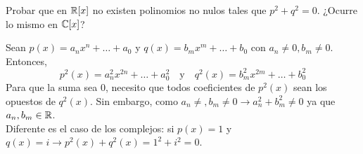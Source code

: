 \item Probar que en $\mathbb{R}[x]$ no existen polinomios no nulos tales que $p^2+q^2=0$. ¿Ocurre lo mismo en $\mathbb{C}[x]$?
    \begin{mdframed}[style=s]
        Sean $p(x)=a_nx^n+\dots+a_0$ y $q(x)=b_mx^m+\dots+b_0$ con $a_n\neq0,b_m\neq0$. Entonces,\[p^2(x)=a_n^2x^{2n}+\dots+a_0^2\quad\text{y}\quad q^2(x)=b_m^2x^{2m}+\dots+b_0^2\]
        Para que la suma sea 0, necesito que todos coeficientes de $p^2(x)$ sean los opuestos de $q^2(x)$. Sin embargo, como $a_n\neq,b_m\neq0\to a_n^2+b_m^2\neq0$ ya que $a_n,b_m\in\mathbb{R}$.\\
        Diferente es el caso de los complejos: si $p(x)=1$ y $q(x)=i\to p^2(x)+q^2(x)=1^2+i^2=0$.
    \end{mdframed}
